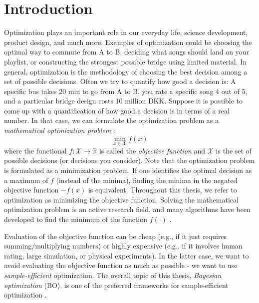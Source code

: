 \chapter{Introduction}



Optimization plays an important role in our everyday life, science development, product design, and
much more. Examples of optimization could be choosing the optimal way to commute from A to B,
deciding what songs should land on your playlist, or constructing the strongest possible bridge
using limited material. In general, optimization is the methodology of choosing the best decision
among a set of possible decisions. Often we try to quantify how good a decision is: A specific bus
takes 20 min to go from A to B, you rate a specific song 4 out of 5, and a particular bridge design
costs 10 million DKK. Suppose it is possible to come up with a quantification of how good a
decision is in terms of a real number. In that case, we can formulate the optimization problem as
a \textit{mathematical optimization problem} \cite[123]{boyd2004convex}: 
$$\min_{x\in \mathcal{X}} f(x)$$ where the functional $f: \mathcal{X} \rightarrow \mathbb{R}$ is
called the \textit{objective function} and $\mathcal{X}$ is the set of possible decisions (or decisions you
consider). Note that the optimization problem is formulated as a minimization problem. If one
identifies the optimal decision as a maximum of $f$ (instead of the minima), finding the minima in
the negated objective function $-f(x)$ is equivalent. Throughout this thesis, we refer to
optimization as minimizing the objective function. Solving the mathematical optimization problem is
an active research field, and many algorithms have been developed to find the minimum of the function
$f(\cdot)$ \cite{boyd2004convex}.

Evaluation of the objective function can be cheap (e.g., if it just requires summing/multiplying
numbers) or highly expensive (e.g., if it involves human rating, large simulation, or physical
experiments). In the latter case, we want to avoid evaluating the objective function as much as
possible - we want to use \textit{sample-efficient} optimization. The overall topic of this thesis,
\textit{Bayesian optimization} (BO), is one of the preferred frameworks for sample-efficient
optimization \cite{TakeHumanOutOfLoop}.

